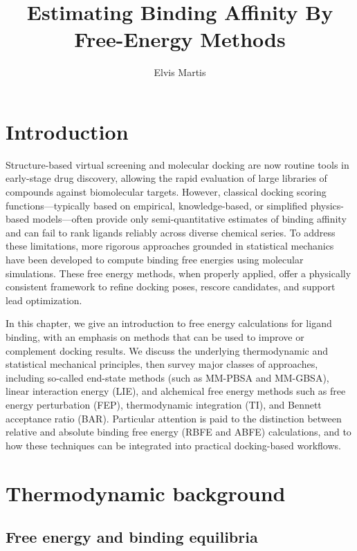 \documentclass[12pt]{article}
\title{Estimating Binding Affinity By Free-Energy Methods}
\author{Elvis Martis}
\date{}
\begin{document}
\maketitle

\section{Introduction}

Structure-based virtual screening and molecular docking are now routine tools in early-stage drug discovery, allowing the rapid evaluation of large libraries of compounds against biomolecular targets.\cite{CH10_brooijmans2003docking,CH10_jorgensen2004science} 
However, classical docking scoring functions---typically based on empirical, knowledge-based, or simplified physics-based models---often provide only semi-quantitative estimates of binding affinity and can fail to rank ligands reliably across diverse chemical series.\cite{CH10_gohlke2000knowledge,CH10_michel2006binding} 
To address these limitations, more rigorous approaches grounded in statistical mechanics have been developed to compute binding free energies using molecular simulations. 
These free energy methods, when properly applied, offer a physically consistent framework to refine docking poses, rescore candidates, and support lead optimization. 

In this chapter, we give an introduction to free energy calculations for ligand binding, with an emphasis on methods that can be used to improve or complement docking results. 
We discuss the underlying thermodynamic and statistical mechanical principles, then survey major classes of approaches, including so-called end-state methods (such as MM-PBSA and MM-GBSA), linear interaction energy (LIE), and alchemical free energy methods such as free energy perturbation (FEP), thermodynamic integration (TI), and Bennett acceptance ratio (BAR). 
Particular attention is paid to the distinction between relative and absolute binding free energy (RBFE and ABFE) calculations, and to how these techniques can be integrated into practical docking-based workflows. 

\section{Thermodynamic background}

\subsection{Free energy and binding equilibria}
\end{document}
